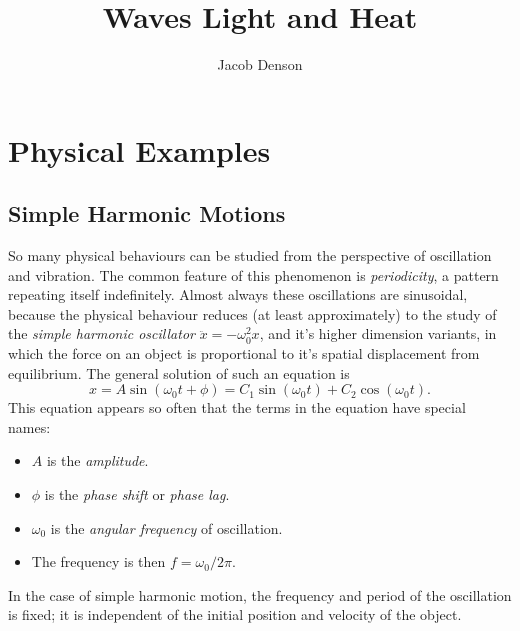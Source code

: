 

\title{Waves Light and Heat}
\author{Jacob Denson}



\maketitle
\tableofcontents
{}

\chapter{Physical Examples}

\section{Simple Harmonic Motions}

So many physical behaviours can be studied from the perspective of oscillation and vibration. The common feature of this phenomenon is \emph{periodicity}, a pattern repeating itself indefinitely. Almost always these oscillations are sinusoidal, because the physical behaviour reduces (at least approximately) to the study of the \emph{simple harmonic oscillator} $\ddot{x} = - \omega_0^2 x$, and it's higher dimension variants, in which the force on an object is proportional to it's spatial displacement from equilibrium. The general solution of such an equation is
%
\[ x = A \sin(\omega_0 t + \phi) = C_1 \sin(\omega_0 t) + C_2 \cos(\omega_0 t). \]
%
This equation appears so often that the terms in the equation have special names:
%
\begin{itemize}
    \item $A$ is the \emph{amplitude}.
    \item $\phi$ is the \emph{phase shift} or \emph{phase lag}.
    \item $\omega_0$ is the \emph{angular frequency} of oscillation.
    \item The frequency is then $f = \omega_0 / 2\pi$.
\end{itemize}
%
In the case of simple harmonic motion, the frequency and period of the oscillation is fixed; it is independent of the initial position and velocity of the object.

